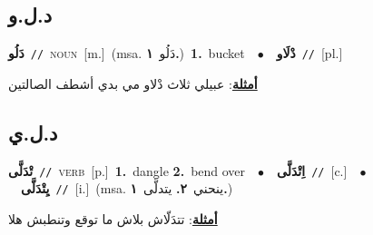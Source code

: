\documentclass[10pt,a4paper,twoside]{article} %
\begin{document}
\begin{multicols}{2}
\vspace{-3mm}
\subsection*{\color{blue}\foreignlanguage{arabic}{د.ل.و}\color{blue}{}} 

{\setlength\topsep{0pt}\textbf{\foreignlanguage{arabic}{دَلُو}}\ {\color{gray}\texttt{//}\color{black}}\ \textsc{noun}\ [m.]\ \color{gray}(msa. \foreignlanguage{arabic}{دَلُو}~\foreignlanguage{arabic}{\textbf{١.}})\color{black}\ \textbf{1.}~bucket\ \ $\bullet$\ \ \setlength\topsep{0pt}\textbf{\foreignlanguage{arabic}{دْلَاو}}\ {\color{gray}\texttt{//}\color{black}}\ [pl.]\  \begin{flushright}\color{gray}\foreignlanguage{arabic}{\textbf{\underline{\foreignlanguage{arabic}{أمثلة}}}: عبيلي ثلاث دْلاو مي بدي أشطف الصالتين}\end{flushright}\color{black}} \vspace{2mm}

\vspace{-3mm}
\subsection*{\color{blue}\foreignlanguage{arabic}{د.ل.ي}\color{blue}{}} 

{\setlength\topsep{0pt}\textbf{\foreignlanguage{arabic}{تْدَلَّى}}\ {\color{gray}\texttt{//}\color{black}}\ \textsc{verb}\ [p.]\ \textbf{1.}~dangle  \textbf{2.}~bend over\ \ $\bullet$\ \ \setlength\topsep{0pt}\textbf{\foreignlanguage{arabic}{اِتْدَلَّى}}\ {\color{gray}\texttt{//}\color{black}}\ [c.]\ \ $\bullet$\ \ \setlength\topsep{0pt}\textbf{\foreignlanguage{arabic}{يِتْدَلَّى}}\ {\color{gray}\texttt{//}\color{black}}\ [i.]\ \color{gray}(msa. \foreignlanguage{arabic}{ينحني}~\foreignlanguage{arabic}{\textbf{٢.}}  \foreignlanguage{arabic}{يتدلَّى}~\foreignlanguage{arabic}{\textbf{١.}})\color{black}\  \begin{flushright}\color{gray}\foreignlanguage{arabic}{\textbf{\underline{\foreignlanguage{arabic}{أمثلة}}}: تتدَلّاش بلاش ما توقع وتنطبش هلا}\end{flushright}\color{black}} \vspace{2mm}


\end{multicols}
\end{document}
